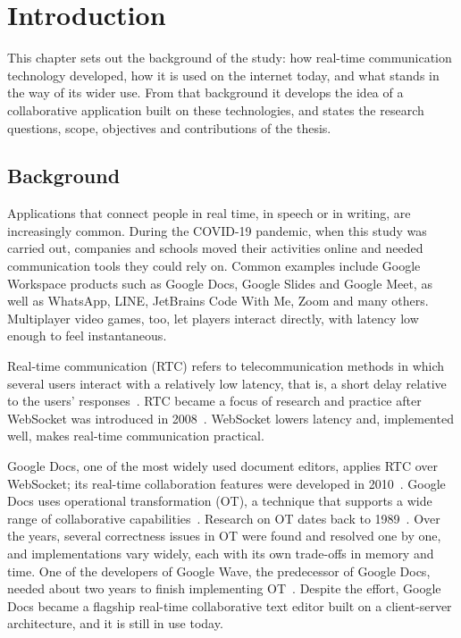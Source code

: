 \chapter{Introduction}
\label{bab:1}

This chapter sets out the background of the study: how real-time communication technology developed, how it is used on the internet today, and what stands in the way of its wider use. From that background it develops the idea of a collaborative application built on these technologies, and states the research questions, scope, objectives and contributions of the thesis.

\section{Background}
\label{sec:latarBelakang}

Applications that connect people in real time, in speech or in writing, are increasingly common. During the COVID-19 pandemic, when this study was carried out, companies and schools moved their activities online and needed communication tools they could rely on. Common examples include Google Workspace products such as Google Docs, Google Slides and Google Meet, as well as WhatsApp, LINE, JetBrains Code With Me, Zoom and many others. Multiplayer video games, too, let players interact directly, with latency low enough to feel instantaneous.

Real-time communication (RTC) refers to telecommunication methods in which several users interact with a relatively low latency, that is, a short delay relative to the users' responses~\citep{arefin2013modified}. RTC became a focus of research and practice after WebSocket was introduced in 2008~\citep{fette2011websocket, reynolds2008web}. WebSocket lowers latency and, implemented well, makes real-time communication practical.

Google Docs, one of the most widely used document editors, applies RTC over WebSocket; its real-time collaboration features were developed in 2010~\citep{googledocs1}. Google Docs uses operational transformation (OT), a technique that supports a wide range of collaborative capabilities~\citep{googledocs2,googledocs3}. Research on OT dates back to 1989~\citep{Ellis1989}. Over the years, several correctness issues in OT were found and resolved one by one, and implementations vary widely, each with its own trade-offs in memory and time. One of the developers of Google Wave, the predecessor of Google Docs, needed about two years to finish implementing OT~\citep{shareJS}. Despite the effort, Google Docs became a flagship real-time collaborative text editor built on a client-server architecture, and it is still in use today.

